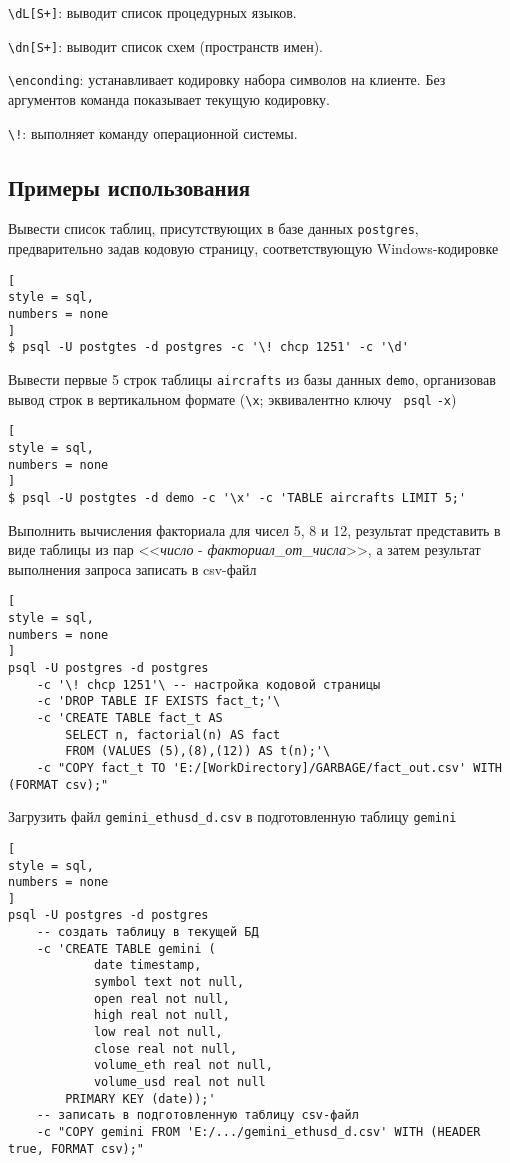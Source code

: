 \documentclass[%
	11pt,
	a4paper,
	utf8,
		]{article}
\begin{document}
\noindent\verb|\dL[S+]|: выводит список процедурных языков.

\noindent\verb|\dn[S+]|: выводит список схем (пространств имен).

\noindent\verb|\enconding|: устанавливает кодировку набора символов на клиенте. Без аргументов команда показывает текущую кодировку.

\noindent\verb|\!|: выполняет команду операционной системы.



\subsection{Примеры использования}

Вывести список таблиц, присутствующих в базе данных \texttt{postgres}, предварительно задав кодовую страницу, соответствующую Windows-кодировке
\begin{lstlisting}[
style = sql,
numbers = none
]
$ psql -U postgtes -d postgres -c '\! chcp 1251' -c '\d'
\end{lstlisting}

Вывести первые 5 строк таблицы \texttt{aircrafts} из базы данных \texttt{demo}, организовав вывод строк в вертикальном формате (\verb|\x|; эквивалентно ключу \texttt{ psql} \verb|-x|)
\begin{lstlisting}[
style = sql,
numbers = none
]
$ psql -U postgtes -d demo -c '\x' -c 'TABLE aircrafts LIMIT 5;'
\end{lstlisting}

Выполнить вычисления факториала для чисел 5, 8 и 12, результат представить в виде таблицы из пар <<\emph{число} - \emph{факториал\_от\_числа}>>, а затем результат выполнения запроса записать в csv-файл
\begin{lstlisting}[
style = sql,
numbers = none
]
psql -U postgres -d postgres
    -c '\! chcp 1251'\ -- настройка кодовой страницы
    -c 'DROP TABLE IF EXISTS fact_t;'\
    -c 'CREATE TABLE fact_t AS
        SELECT n, factorial(n) AS fact
        FROM (VALUES (5),(8),(12)) AS t(n);'\
    -c "COPY fact_t TO 'E:/[WorkDirectory]/GARBAGE/fact_out.csv' WITH (FORMAT csv);"
\end{lstlisting}

Загрузить файл \texttt{gemini\_ethusd\_d.csv} в подготовленную таблицу \texttt{gemini}
\begin{lstlisting}[
style = sql,
numbers = none
]
psql -U postgres -d postgres
    -- создать таблицу в текущей БД
    -c 'CREATE TABLE gemini ( 
            date timestamp,
            symbol text not null,
            open real not null,
            high real not null,
            low real not null,
            close real not null,
            volume_eth real not null,
            volume_usd real not null
        PRIMARY KEY (date));'
    -- записать в подготовленную таблицу csv-файл
    -c "COPY gemini FROM 'E:/.../gemini_ethusd_d.csv' WITH (HEADER true, FORMAT csv);"
\end{lstlisting}
\end{document}
